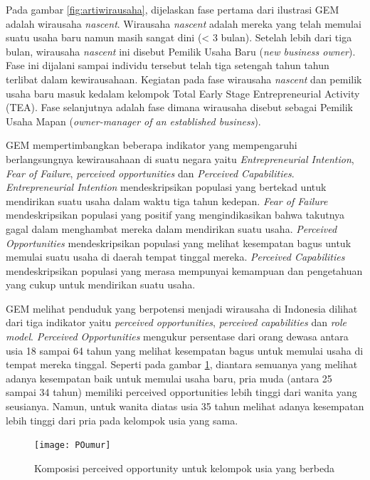 Pada gambar \ref{fig:artiwirausaha}, dijelaskan fase pertama dari ilustrasi GEM adalah wirausaha \textit{nascent}. Wirausaha \textit{nascent} adalah mereka yang telah memulai suatu usaha baru namun masih sangat dini (< 3 bulan). Setelah lebih dari tiga bulan, wirausaha \textit{nascent} ini disebut Pemilik Usaha Baru (\textit{new business owner}). Fase ini dijalani sampai individu tersebut telah tiga setengah tahun tahun terlibat dalam kewirausahaan. Kegiatan pada fase wirausaha \textit{nascent} dan pemilik usaha baru masuk kedalam kelompok Total Early Stage Entrepreneurial Activity (TEA). Fase selanjutnya adalah fase dimana wirausaha disebut sebagai Pemilik Usaha Mapan (\textit{owner-manager of an established business}). 

GEM mempertimbangkan beberapa indikator yang mempengaruhi berlangsungnya kewirausahaan di suatu negara yaitu \textit{Entrepreneurial Intention}, \textit{Fear of Failure}, \textit{perceived opportunities} dan \textit{Perceived Capabilities}. \textit{Entrepreneurial Intention} mendeskripsikan populasi yang bertekad untuk mendirikan suatu usaha dalam waktu tiga tahun kedepan. \textit{Fear of Failure} mendeskripsikan populasi yang positif yang mengindikasikan bahwa takutnya gagal dalam menghambat mereka dalam mendirikan suatu usaha. \textit{Perceived Opportunities} mendeskripsikan populasi yang melihat kesempatan bagus untuk memulai suatu usaha di daerah tempat tinggal mereka. \textit{Perceived Capabilities} mendeskripsikan populasi yang merasa mempunyai kemampuan dan pengetahuan yang cukup untuk mendirikan suatu usaha.

GEM melihat penduduk yang berpotensi menjadi wirausaha di Indonesia
dilihat dari tiga indikator yaitu \textit{perceived opportunities}, \textit{perceived capabilities} dan \textit{role model}. \textit{Perceived Opportunities} mengukur persentase dari orang dewasa antara usia 18 sampai 64 tahun yang melihat kesempatan bagus untuk memulai usaha di tempat mereka tinggal. Seperti pada gambar \ref{fig:perceivedopportunity}, diantara semuanya yang melihat adanya kesempatan baik untuk memulai usaha baru, pria muda (antara 25 sampai 34 tahun) memiliki perceived opportunities lebih tinggi dari wanita yang seusianya. Namun, untuk wanita diatas usia 35 tahun melihat adanya kesempatan lebih tinggi dari pria pada kelompok usia yang sama.

\begin{figure} [H]
	\centering  
	\texttt{[image: POumur]} 
	\caption[Komposisi perceived opportunity untuk kelompok usia yang berbeda]{Komposisi perceived opportunity untuk kelompok usia yang berbeda} 
	\label{fig:perceivedopportunity} 
\end{figure}

